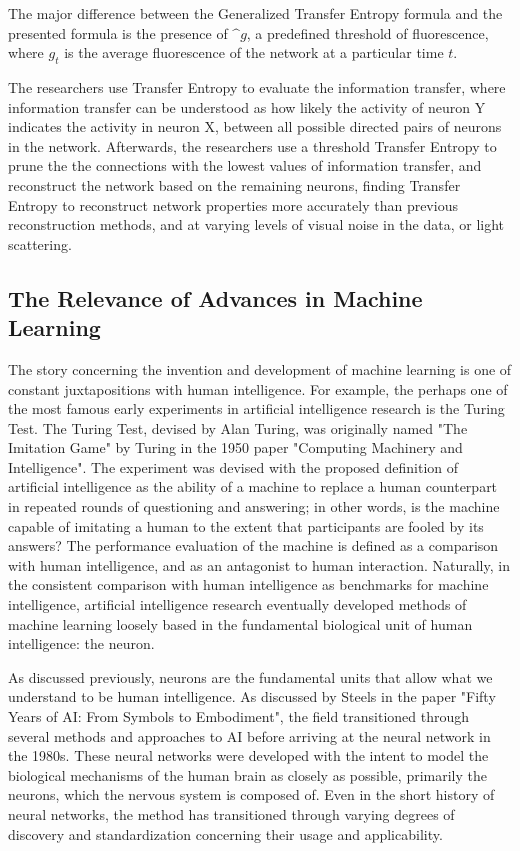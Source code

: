 \documentclass{article}
\begin{document}
The major difference between the Generalized Transfer Entropy formula and the presented formula is the presence of $\^g$, a predefined threshold of fluorescence, where $g_t$ is the average fluorescence of the network at a particular time $t$.\par

The researchers use Transfer Entropy to evaluate the information transfer, where information transfer can be understood as how likely the activity of neuron Y indicates the activity in neuron X, between all possible directed pairs of neurons in the network. Afterwards, the researchers use a threshold Transfer Entropy to prune the the connections with the lowest values of information transfer, and reconstruct the network based on the remaining neurons, finding Transfer Entropy to reconstruct network properties more accurately than previous reconstruction methods, and at varying levels of visual noise in the data, or light scattering.\par

\subsection{The Relevance of Advances in Machine Learning}
The story concerning the invention and development of machine learning is one of constant juxtapositions with human intelligence. For example, the perhaps one of the most famous early experiments in artificial intelligence research is the Turing Test. The Turing Test, devised by Alan Turing, was originally named "The Imitation Game" by Turing in the 1950 paper "Computing Machinery and Intelligence". The experiment was devised with the proposed definition of artificial intelligence as the ability of a machine to replace a human counterpart in repeated rounds of questioning and answering; in other words, is the machine capable of imitating a human to the extent that participants are fooled by its answers? The performance evaluation of the machine is defined as a comparison with human intelligence, and as an antagonist to human interaction. Naturally, in the consistent comparison with human intelligence as benchmarks for machine intelligence, artificial intelligence research eventually developed methods of machine learning loosely based in the fundamental biological unit of human intelligence: the neuron.\par

As discussed previously, neurons are the fundamental units that allow what we understand to be human intelligence. As discussed by Steels in the paper "Fifty Years of AI: From Symbols to Embodiment", the field transitioned through several methods and approaches to AI before arriving at the neural network in the 1980s. These neural networks were developed with the intent to model the biological mechanisms of the human brain as closely as possible, primarily the neurons, which the nervous system is composed of. Even in the short history of neural networks, the method has transitioned through varying degrees of discovery and standardization concerning their usage and applicability.\par
\end{document}
